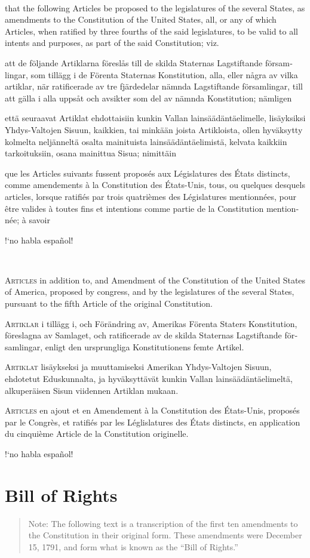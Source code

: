 \documentclass[a4paper,landscape,10pt]{article}
\newcommand{\tblock}[5]{\noindent\begin{minipage}[t]{0.18\textwidth}\foreignlanguage{english}{#1}\end{minipage}\hskip 0.025\textwidth\begin{minipage}[t]{0.18\textwidth}\foreignlanguage{swedish}{#2}\end{minipage}\hskip 0.025\textwidth\begin{minipage}[t]{0.18\textwidth}\foreignlanguage{finnish}{#3}\end{minipage}\hskip 0.025\textwidth\begin{minipage}[t]{0.18\textwidth}\foreignlanguage{french}{#4}\end{minipage}\hskip 0.025\textwidth\begin{minipage}[t]{0.18\textwidth}\foreignlanguage{spanish}{#5}\end{minipage}}
\begin{document}
~

\tblock
{that the following Articles be proposed to the \Glspl{legislature} of the several States, as amendments to the Constitution of the United States, all, or any of which Articles, when ratified by three fourths of the said \Glspl{legislature}, to be valid to all intents and purposes, as part of the said Constitution; viz.}
{att de följande Artiklarna föreslås till de skilda Staternas Lagstiftande församlingar, som tillägg i de Förenta Staternas Konstitution, alla, eller några av vilka artiklar, när ratificerade av tre fjärdedelar nämnda Lagstiftande församlingar, till att gälla i alla uppsåt och avsikter som del av nämnda Konstitution; nämligen}
{että seuraavat Artiklat ehdottaisiin kunkin Vallan lainsäädäntäelimelle, lisäyksiksi Yhdys-Valtojen Sisuun, kaikkien, tai minkään joista Artikloista, ollen hyväksytty kolmelta neljänneltä osalta mainituista lainsäädäntäelimistä, kelvata kaikkiin tarkoituksiin, osana mainittua Sisua; nimittäin}
{que les Articles suivants fussent proposés aux Législatures des États distincts, comme amendements à la Constitution des États-Unis, tous, ou quelques desquels articles, lorsque ratifiés par trois quatrièmes des Législatures mentionnées, pour être valides à toutes fins et intentions comme partie de la Constitution mentionnée; à savoir}
{!`no habla español!}

~

\tblock
{\textsc{Articles} in addition to, and Amendment of the Constitution of the United States of America, proposed by \Gls{congress}, and \glsdisp{ratify}{ratified} by the \Glspl{legislature} of the several States, pursuant to the fifth Article of the original Constitution.}
{\textsc{Artiklar} i tillägg i, och Förändring av, Amerikas Förenta Staters Konstitution, föreslagna av Samlaget, och ratificerade av de skilda Staternas Lagstiftande församlingar, enligt den ursprungliga Konstitutionens femte Artikel.}
{\textsc{Artiklat} lisäykseksi ja muuttamiseksi Amerikan Yhdys-Valtojen Sisuun, ehdotetut Eduskunnalta, ja hyväksyttävät kunkin Vallan lainsäädäntäelimeltä, alkuperäisen Sisun viidennen Artiklan mukaan.}
{\textsc{Articles} en ajout et en Amendement à la Constitution des États-Unis, proposés par le Congrès, et ratifiés par les Léglislatures des États distincts, en application du cinquième Article de la Constitution originelle.}
{!`no habla español!}

\section*{Bill of Rights}
\begin{quote}\small{}
Note: The following text is a transcription of the first ten amendments to the Constitution in their original form. These amendments were  December 15, 1791, and form what is known as the ``Bill of Rights.''
\end{quote}
\end{document}

